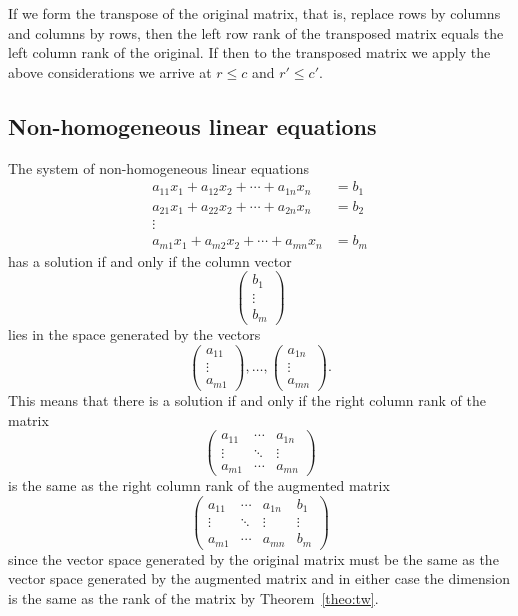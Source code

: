 \documentclass[11pt]{article}
\theoremstyle{definition}
\begin{document}
If we form the transpose of the original matrix, that is, replace rows by columns and columns by rows, then the left row rank of the transposed matrix equals the left column rank of the original.
If then to the transposed matrix we apply the above considerations we arrive at $r \leq c$ and $r' \leq c'$.



\subsection{Non-homogeneous linear equations}

The system of non-homogeneous linear equations
\begin{equation}
\label{eq:Etw}
\begin{aligned}
a_{11}x_1 + a_{12}x_2 + \cdots + a_{1n}x_n &= b_1
\\
a_{21}x_1 + a_{22}x_2 + \cdots + a_{2n}x_n &= b_2
\\
\vdots &
\\
a_{m1}x_1 + a_{m2}x_2 + \cdots + a_{mn}x_n &= b_m
\end{aligned}
\end{equation}
has a solution if and only if the column vector
\[
\begin{pmatrix}
b_1 \\ \vdots \\ b_m
\end{pmatrix}
\]
lies in the space generated by the vectors
\[
\begin{pmatrix}
a_{11} \\ \vdots \\ a_{m1}
\end{pmatrix}
, \ldots, 
\begin{pmatrix}
a_{1n} \\ \vdots \\ a_{mn}
\end{pmatrix}.
\]
This means that there is a solution if and only if the right column rank of the matrix
\[
\begin{pmatrix}
a_{11} & \cdots & a_{1n}
\\
\vdots & \ddots & \vdots
\\
a_{m1} & \cdots & a_{mn}
\end{pmatrix}
\]
is the same as the right column rank of the augmented matrix
\[
\begin{pmatrix}
a_{11} & \cdots & a_{1n} & b_1
\\
\vdots & \ddots & \vdots & \vdots
\\
a_{m1} & \cdots & a_{mn} & b_m
\end{pmatrix}
\]
since the vector space generated by the original matrix must be the same as the vector space generated by the augmented matrix and in either case the dimension is the same as the rank of the matrix by Theorem~\ref{theo:tw}.
\end{document}
